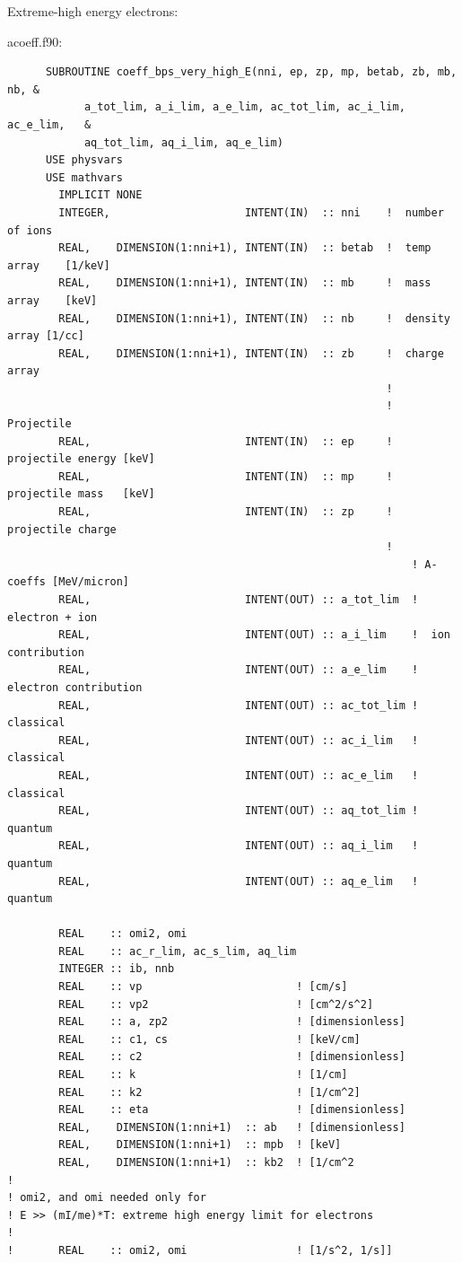 \documentclass[preprint,12pt,eqsecnum,nofootinbib,amsmath,amssymb]{revtex4}
\begin{document}
{{\begin{verbatim}
\end{verbatim}

\noindent
Extreme-high energy electrons:

\vskip1cm
\noindent
acoeff.f90:
{
\baselineskip 10pt
\begin{verbatim}
      SUBROUTINE coeff_bps_very_high_E(nni, ep, zp, mp, betab, zb, mb, nb, &
            a_tot_lim, a_i_lim, a_e_lim, ac_tot_lim, ac_i_lim, ac_e_lim,   &
            aq_tot_lim, aq_i_lim, aq_e_lim)
      USE physvars
      USE mathvars      
        IMPLICIT NONE
        INTEGER,                     INTENT(IN)  :: nni    !  number of ions
        REAL,    DIMENSION(1:nni+1), INTENT(IN)  :: betab  !  temp array    [1/keV]
        REAL,    DIMENSION(1:nni+1), INTENT(IN)  :: mb     !  mass array    [keV]
        REAL,    DIMENSION(1:nni+1), INTENT(IN)  :: nb     !  density array [1/cc]
        REAL,    DIMENSION(1:nni+1), INTENT(IN)  :: zb     !  charge array
                                                           !
                                                           ! Projectile  
        REAL,                        INTENT(IN)  :: ep     !  projectile energy [keV]
        REAL,                        INTENT(IN)  :: mp     !  projectile mass   [keV]
        REAL,                        INTENT(IN)  :: zp     !  projectile charge
                                                           !
                                                               ! A-coeffs [MeV/micron]
        REAL,                        INTENT(OUT) :: a_tot_lim  !  electron + ion
        REAL,                        INTENT(OUT) :: a_i_lim    !  ion contribution
        REAL,                        INTENT(OUT) :: a_e_lim    !  electron contribution
        REAL,                        INTENT(OUT) :: ac_tot_lim !  classical
        REAL,                        INTENT(OUT) :: ac_i_lim   !  classical
        REAL,                        INTENT(OUT) :: ac_e_lim   !  classical
        REAL,                        INTENT(OUT) :: aq_tot_lim !  quantum
        REAL,                        INTENT(OUT) :: aq_i_lim   !  quantum
        REAL,                        INTENT(OUT) :: aq_e_lim   !  quantum

        REAL    :: omi2, omi
        REAL    :: ac_r_lim, ac_s_lim, aq_lim
        INTEGER :: ib, nnb
        REAL    :: vp                        ! [cm/s]
        REAL    :: vp2                       ! [cm^2/s^2]
        REAL    :: a, zp2                    ! [dimensionless]
        REAL    :: c1, cs                    ! [keV/cm]
        REAL    :: c2                        ! [dimensionless]
        REAL    :: k                         ! [1/cm]
        REAL    :: k2                        ! [1/cm^2]
        REAL    :: eta                       ! [dimensionless]
        REAL,    DIMENSION(1:nni+1)  :: ab   ! [dimensionless]
        REAL,    DIMENSION(1:nni+1)  :: mpb  ! [keV]
        REAL,    DIMENSION(1:nni+1)  :: kb2  ! [1/cm^2
!
! omi2, and omi needed only for 
! E >> (mI/me)*T: extreme high energy limit for electrons
!
!       REAL    :: omi2, omi                 ! [1/s^2, 1/s]]


\end{verbatim}}}}
\end{document}
